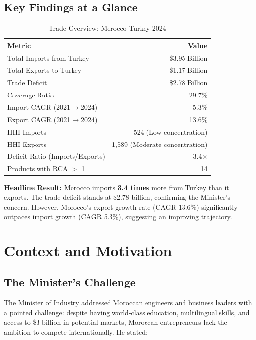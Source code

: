 \documentclass[12pt,a4paper]{article}
\begin{document}
\subsection{Key Findings at a Glance}

\begin{table}[H]
\centering
\caption{Trade Overview: Morocco-Turkey 2024}
\begin{tabular}{l r}
\toprule
\textbf{Metric} & \textbf{Value} \\
\midrule
Total Imports from Turkey & \$3.95 Billion \\
Total Exports to Turkey & \$1.17 Billion \\
Trade Deficit & \$2.78 Billion \\
Coverage Ratio & 29.7\% \\
Import CAGR (2021$\rightarrow$2024) & 5.3\% \\
Export CAGR (2021$\rightarrow$2024) & 13.6\% \\
HHI Imports & 524 (Low concentration) \\
HHI Exports & 1,589 (Moderate concentration) \\
Deficit Ratio (Imports/Exports) & 3.4$\times$ \\
Products with RCA $>$ 1 & 14 \\
\bottomrule
\end{tabular}
\end{table}

\noindent\textbf{Headline Result:} Morocco imports \textbf{3.4 times} more from Turkey than it exports. The trade deficit stands at \$2.78 billion, confirming the Minister's concern. However, Morocco's export growth rate (CAGR 13.6\%) significantly outpaces import growth (CAGR 5.3\%), suggesting an improving trajectory.

\section{Context and Motivation}

\subsection{The Minister's Challenge}

The Minister of Industry addressed Moroccan engineers and business leaders with a pointed challenge: despite having world-class education, multilingual skills, and access to \$3 billion in potential markets, Moroccan entrepreneurs lack the ambition to compete internationally. He stated:
\end{document}
